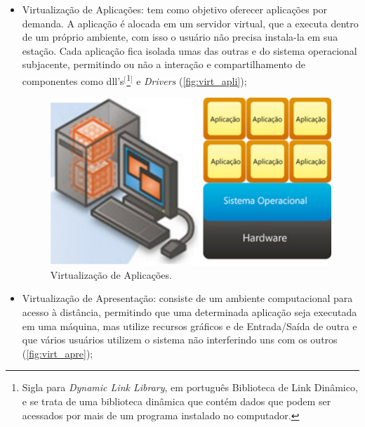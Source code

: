 \begin{itemize}
    \item Virtualização de Aplicações: tem como objetivo oferecer aplicações por demanda. A aplicação é alocada em um servidor virtual, que a executa dentro de um próprio ambiente, com isso o usuário não precisa instala-la em sua estação. Cada aplicação fica isolada umas das outras e do sistema operacional subjacente, permitindo ou não a interação e compartilhamento de componentes como dll's$^{[}$\footnote{Sigla para \textit{Dynamic Link Library}, em português Biblioteca de Link Dinâmico, e se trata de uma biblioteca dinâmica que contém dados que podem ser acessados por mais de um programa instalado no computador.}$^{]}$ e \textit{Drivers} (\autoref{fig:virt_apli});

    \begin{figure}[htb]
    	\caption{\label{fig:virt_apli}Virtualização de Aplicações.}
    	\begin{center}
    	    \includegraphics[scale=0.29]{imagens/virtualizacao-aplicacao.jpg}
    	\end{center}
    \end{figure} 
    
    \item Virtualização de Apresentação: consiste de um ambiente computacional para acesso à distância, permitindo que uma determinada aplicação seja executada em uma máquina, mas utilize recursos gráficos e de Entrada/Saída de outra e que vários usuários utilizem o sistema não interferindo uns com os outros (\autoref{fig:virt_apre});
    

\end{itemize}
